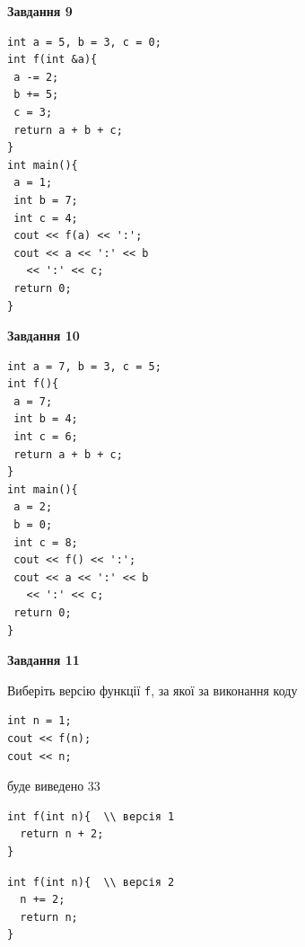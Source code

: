 \documentclass[12pt, ukrainian]{article}
\def\code#1{\Verb!#1!}
\begin{document}
{\begin {large}
\begin{minipage}[t]{11.0cm}
\end{minipage}


\begin{minipage}[t]{7.0cm}

\begin{center}
\textbf{Завдання 9}
\end{center}
\vspace{-8mm}

\begin{verbatim}
int a = 5, b = 3, c = 0;
int f(int &a){
 a -= 2;
 b += 5;
 c = 3;
 return a + b + c;
}
int main(){
 a = 1;
 int b = 7;
 int c = 4;
 cout << f(a) << ':';
 cout << a << ':' << b 
   << ':' << c;
 return 0;
}
\end{verbatim}



\begin{center}
\textbf{Завдання 10}
\end{center}
\vspace{-8mm}

\begin{verbatim}
int a = 7, b = 3, c = 5;
int f(){
 a = 7;
 int b = 4;
 int c = 6;
 return a + b + c;
}
int main(){
 a = 2;
 b = 0;
 int c = 8;
 cout << f() << ':';
 cout << a << ':' << b 
   << ':' << c;
 return 0;
}
\end{verbatim}

\end{minipage}
\vline \hspace{1mm}
\begin{minipage}[t]{11.0cm}

\begin{center}
\textbf{Завдання 11}
\end{center}
Виберіть версію функції \code{f}, за якої за виконання коду
\begin{verbatim}
int n = 1;
cout << f(n);
cout << n;
\end{verbatim}

буде виведено 33

\begin{verbatim}
int f(int n){  \\ версія 1
  return n + 2;
}
\end{verbatim}

\vspace{-8mm}\begin{verbatim}
int f(int n){  \\ версія 2
  n += 2;
  return n;
}
\end{verbatim}


\end{minipage}
\end{large}}
\end{document}
